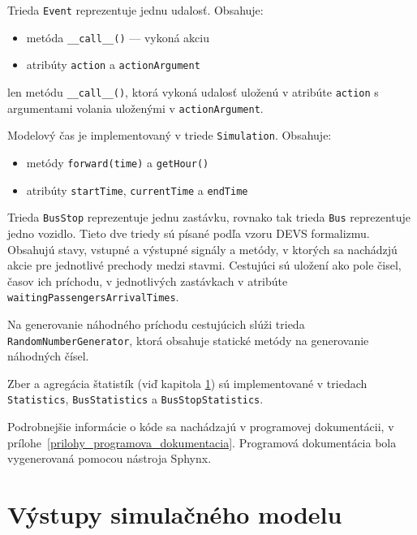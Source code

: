Trieda \texttt{Event} reprezentuje jednu udalosť.
Obsahuje:
\begin{itemize}
  \item metóda \texttt{\_\_call\_\_()} --- vykoná akciu
  \item atribúty \texttt{action} a \texttt{actionArgument}
\end{itemize}

len metódu \texttt{\_\_call\_\_()}, ktorá vykoná udalosť uloženú v atribúte \texttt{action} s argumentami volania uloženými v \texttt{actionArgument}.

Modelový čas je implementovaný v triede \texttt{Simulation}.
Obsahuje:
\begin{itemize}
  \item metódy \texttt{forward(time)} a \texttt{getHour()}
  \item atribúty \texttt{startTime}, \texttt{currentTime} a \texttt{endTime}
\end{itemize}

Trieda \texttt{BusStop} reprezentuje jednu zastávku, rovnako tak trieda \texttt{Bus} reprezentuje jedno vozidlo.
Tieto dve triedy sú písané podľa vzoru DEVS formalizmu. Obsahujú stavy, vstupné a výstupné signály a metódy, v ktorých sa nachádzjú akcie pre jednotlivé prechody medzi stavmi.
Cestujúci sú uložení ako pole čisel, časov ich príchodu, v jednotlivých zastávkach v atribúte \texttt{waitingPassengersArrivalTimes}.

Na generovanie náhodného príchodu cestujúcich slúži trieda \texttt{RandomNumberGenerator}, ktorá obsahuje statické metódy na generovanie náhodných čísel.

Zber a agregácia štatistík (viď kapitola \ref{vystupy_simulacneho_modelu}) sú implementované v triedach \texttt{Statistics}, \texttt{BusStatistics} a \texttt{BusStopStatistics}.

Podrobnejšie informácie o kóde sa nachádzajú v programovej dokumentácii, v prílohe~\ref{prilohy_programova_dokumentacia}.
Programová dokumentácia bola vygenerovaná pomocou nástroja Sphynx.

\section{Výstupy simulačného modelu}
\label{vystupy_simulacneho_modelu}

